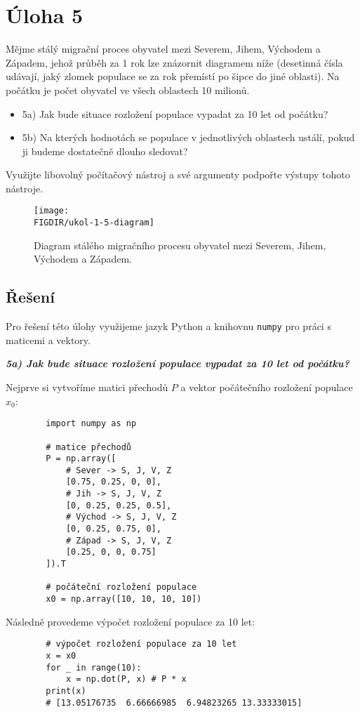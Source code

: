 \documentclass[10pt, a4paper]{ReportSheet}
\newcommand{\FIGDIR}{./assets/figures}
\newcommand{\uloha}[5]{
    \section{Úloha #1\hfill\small\normalfont{(#2 body)}}
    \label{sec:uloha-#1}
    #3
    \subsection{Řešení}
    \label{subsec:uloha-#1-reseni}
    #4
    \ifthenelse{\equal{#5}{false}}{}{\newpage}
}
\begin{document}
    \uloha{5}{3}{
        Mějme stálý migrační proces obyvatel mezi Severem, Jihem, Východem a Západem, jehož průběh za 1 rok lze znázornit diagramem níže (desetinná čísla udávají, jaký zlomek populace se za rok přemístí po šipce do jiné oblasti). Na počátku je počet obyvatel ve všech oblastech 10 milionů.

        \begin{itemize}
            \item 5a) Jak bude situace rozložení populace vypadat za 10 let od počátku?
            \item 5b) Na kterých hodnotách se populace v jednotlivých oblastech ustálí, pokud ji budeme dostatečně dlouho sledovat?
        \end{itemize}

        Využijte libovolný počítačový nástroj a své argumenty podpořte výstupy tohoto nástroje.

        \begin{figure}[H]
            \centering
            \texttt{[image: \\FIGDIR/ukol-1-5-diagram]}
            \caption{Diagram stálého migračního procesu obyvatel mezi Severem, Jihem, Východem a Západem.}
            \label{fig:population-migration}
        \end{figure}
        \source{}
    }{
        Pro řešení této úlohy využijeme jazyk Python a knihovnu \texttt{numpy} pro práci s maticemi a vektory.
    }{false}

    \textbf{\textit{5a) Jak bude situace rozložení populace vypadat za 10 let od počátku?}}

    Nejprve si vytvoříme matici přechodů $P$ a vektor počátečního rozložení populace $x_0$:
    \begin{verbatim}
        import numpy as np

        # matice přechodů
        P = np.array([
            # Sever -> S, J, V, Z
            [0.75, 0.25, 0, 0],
            # Jih -> S, J, V, Z
            [0, 0.25, 0.25, 0.5],
            # Východ -> S, J, V, Z
            [0, 0.25, 0.75, 0],
            # Západ -> S, J, V, Z
            [0.25, 0, 0, 0.75]
        ]).T

        # počáteční rozložení populace
        x0 = np.array([10, 10, 10, 10])
    \end{verbatim}

    Následně provedeme výpočet rozložení populace za 10 let:
    \begin{verbatim}
        # výpočet rozložení populace za 10 let
        x = x0
        for _ in range(10):
            x = np.dot(P, x) # P * x
        print(x)
        # [13.05176735  6.66666985  6.94823265 13.33333015]
    \end{verbatim}
\end{document}
